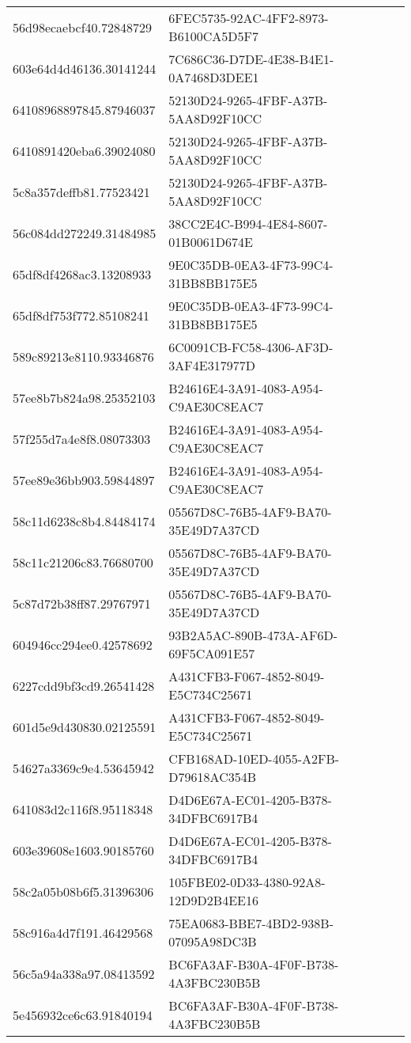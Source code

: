 \begin{tabular}{ll}
56d98ecaebcf40.72848729 & 6FEC5735-92AC-4FF2-8973-B6100CA5D5F7 \\
603e64d4d46136.30141244 & 7C686C36-D7DE-4E38-B4E1-0A7468D3DEE1 \\
64108968897845.87946037 & 52130D24-9265-4FBF-A37B-5AA8D92F10CC \\
6410891420eba6.39024080 & 52130D24-9265-4FBF-A37B-5AA8D92F10CC \\
5c8a357deffb81.77523421 & 52130D24-9265-4FBF-A37B-5AA8D92F10CC \\
56c084dd272249.31484985 & 38CC2E4C-B994-4E84-8607-01B0061D674E \\
65df8df4268ac3.13208933 & 9E0C35DB-0EA3-4F73-99C4-31BB8BB175E5 \\
65df8df753f772.85108241 & 9E0C35DB-0EA3-4F73-99C4-31BB8BB175E5 \\
589c89213e8110.93346876 & 6C0091CB-FC58-4306-AF3D-3AF4E317977D \\
57ee8b7b824a98.25352103 & B24616E4-3A91-4083-A954-C9AE30C8EAC7 \\
57f255d7a4e8f8.08073303 & B24616E4-3A91-4083-A954-C9AE30C8EAC7 \\
57ee89e36bb903.59844897 & B24616E4-3A91-4083-A954-C9AE30C8EAC7 \\
58c11d6238c8b4.84484174 & 05567D8C-76B5-4AF9-BA70-35E49D7A37CD \\
58c11c21206c83.76680700 & 05567D8C-76B5-4AF9-BA70-35E49D7A37CD \\
5c87d72b38ff87.29767971 & 05567D8C-76B5-4AF9-BA70-35E49D7A37CD \\
604946cc294ee0.42578692 & 93B2A5AC-890B-473A-AF6D-69F5CA091E57 \\
6227cdd9bf3cd9.26541428 & A431CFB3-F067-4852-8049-E5C734C25671 \\
601d5e9d430830.02125591 & A431CFB3-F067-4852-8049-E5C734C25671 \\
54627a3369c9e4.53645942 & CFB168AD-10ED-4055-A2FB-D79618AC354B \\
641083d2c116f8.95118348 & D4D6E67A-EC01-4205-B378-34DFBC6917B4 \\
603e39608e1603.90185760 & D4D6E67A-EC01-4205-B378-34DFBC6917B4 \\
58c2a05b08b6f5.31396306 & 105FBE02-0D33-4380-92A8-12D9D2B4EE16 \\
58c916a4d7f191.46429568 & 75EA0683-BBE7-4BD2-938B-07095A98DC3B \\
56c5a94a338a97.08413592 & BC6FA3AF-B30A-4F0F-B738-4A3FBC230B5B \\
5e456932ce6c63.91840194 & BC6FA3AF-B30A-4F0F-B738-4A3FBC230B5B \\

\end{tabular}
